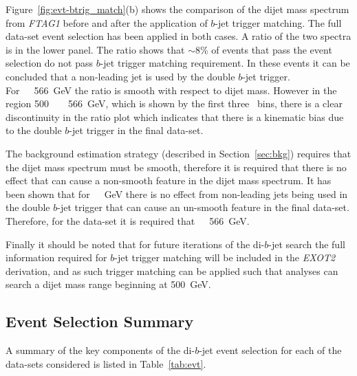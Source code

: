 Figure~\ref{fig:evt-btrig_match}(b) shows the comparison of the dijet mass spectrum from \textit{FTAG1}
before and after the application of $b$-jet trigger matching.
The full \lm{} data-set event selection has been applied in both cases.
A ratio of the two spectra is in the lower panel.
The ratio shows that $\sim$8\% of events that
pass the \lm{} event selection do not pass $b$-jet trigger matching requirement.
In these events it can be concluded that a non-leading jet is used by the double $b$-jet trigger.
For~\mjj~\gt~566~GeV the ratio is smooth with respect to dijet mass.
However in the region 500~\lt~\mjj~\lt~566~GeV, which is shown by the first three \mjj{}~bins,
there is a clear discontinuity in the ratio plot
which indicates that there is a kinematic bias due to the double $b$-jet trigger in the final data-set.

The background estimation strategy (described in Section~\ref{sec:bkg}) requires that the dijet mass spectrum must be smooth,
therefore it is required that there is no effect that can cause a non-smooth feature in the dijet mass spectrum.
It has been shown that for~\mjj~~GeV there is no effect from non-leading jets being used in the double $b$-jet trigger
that can cause an un-smooth feature in the final data-set.
Therefore, for the \lm{} data-set it is required that~\mjj~\gt~566~GeV.

Finally it should be noted that for future iterations of the di-$b$-jet search
the full information required for $b$-jet trigger matching will be included in the \textit{EXOT2} derivation,
and as such trigger matching can be applied such that analyses can search a dijet mass range beginning at 500~GeV.

\subsection{Event Selection Summary}
\label{sec:evt-sel-acc}

A summary of the  key components of the di-$b$-jet event selection
for each of the data-sets considered
is listed in Table~\ref{tab:evt}.


